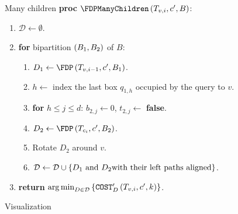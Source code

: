 \begin{frame}{Many children}
    \textbf{proc} $\FDPManyChildren\br{T_{v,i},c',B}$:
    \begin{enumerate}
        \item $\mathcal{D}\gets\emptyset$.
        \item \textbf{for} bipartition $\left( B_1, B_2 \right)$ of $B$:
        \begin{enumerate}
            \item $D_1\gets \FDP\br{T_{v, i-1}, c', B_1}$.

            \item $h\gets$ index the last box $q_{1,h}$ occupied by the query to $v$.

            \item \textbf{for} $h\leq j\leq d$: $b_{2,j}\gets 0$, $t_{2,j}\gets $ \textbf{false}.


            \item $D_2\gets \FDP\br{T_{c_i}, c', B_2}$.

            \item Rotate $D_2$ around $v$.

            \item $\mathcal{D}\gets\mathcal{D}\cup\left\{ D_1 \text{ and } D_2 \text{with their left paths aligned} \right\}$.
        \end{enumerate}
        \item \textbf{return} $\operatorname*{arg\,min}_{D\in \mathcal{D}}\left\{ \texttt{COST}'_D\left( T_{v,i},c', k \right) \right\}$.
    \end{enumerate}
\end{frame}

\begin{frame}{Visualization}
    
\end{frame}
